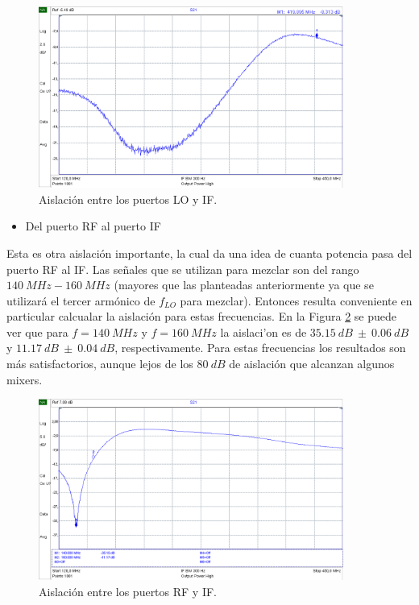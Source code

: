 \documentclass[a4paper,10pt]{article}
\begin{document}
	\begin{figure}[!htb]
		\centering
		\includegraphics[width=10cm]{Images/aislacion1.png}
		\caption{Aislaci\'on entre los puertos LO y IF.}
		\label{isolation1}
	\end{figure}	
	
	\begin{itemize}
		\item Del puerto RF al puerto IF
	\end{itemize}
	
	\indent Esta es otra aislaci\'on importante, la cual da una idea de cuanta 
	potencia pasa del puerto RF al IF. Las se\~nales que se utilizan para 
	mezclar son del rango $140~MHz-160~MHz$ (mayores que las planteadas 
	anteriormente ya que se utilizar\'a el tercer arm\'onico de 
	$f_{LO}$ para mezclar). Entonces resulta conveniente en particular calcualar
	la aislaci\'on para estas frecuencias. En la Figura \ref{isolation2} se 
	puede ver que para $f=140~MHz$ y $f=160~MHz$ la aislaci'on es de 
	$35.15~dB~\pm~0.06~dB$ y $11.17~dB~\pm~0.04~dB$, respectivamente. Para 
	estas frecuencias los resultados son m\'as satisfactorios, aunque lejos de 
	los $80~dB$ de aislaci\'on que alcanzan algunos mixers.
	
	\begin{figure}[!htb]
		\centering
		\includegraphics[width=10cm]{Images/aislacion2.png}
		\caption{Aislaci\'on entre los puertos RF y IF.}
		\label{isolation2}
	\end{figure}
	
\end{document}
